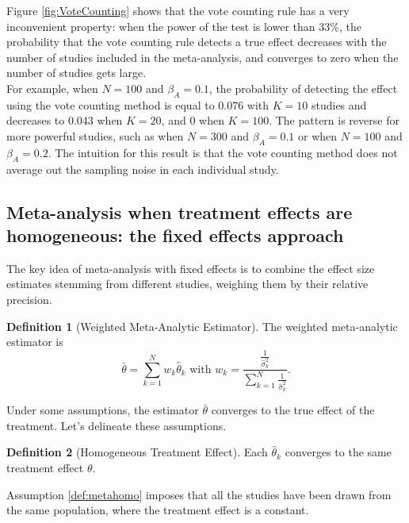 \documentclass[
]{book}
\theoremstyle{definition}
\newtheorem{definition}{Definition}[chapter]
\theoremstyle{definition}
\theoremstyle{definition}
\theoremstyle{definition}
\theoremstyle{remark}
\begin{document}
Figure \ref{fig:VoteCounting} shows that the vote counting rule has a very inconvenient property: when the power of the test is lower than 33\%, the probability that the vote counting rule detects a true effect decreases with the number of studies included in the meta-analysis, and converges to zero when the number of studies gets large.\\
For example, when \(N=100\) and \(\beta_A=0.1\), the probability of detecting the effect using the vote counting method is equal to 0.076 with \(K=10\) studies and decreases to 0.043 when \(K=20\), and 0 when \(K=100\).
The pattern is reverse for more powerful studies, such as when \(N=300\) and \(\beta_A=0.1\) or when \(N=100\) and \(\beta_A=0.2\).
The intuition for this result is that the vote counting method does not average out the sampling noise in each individual study.

\hypertarget{MetaWA}{%
\subsection{Meta-analysis when treatment effects are homogeneous: the fixed effects approach}\label{MetaWA}}

The key idea of meta-analysis with fixed effects is to combine the effect size estimates stemming from different studies, weighing them by their relative precision.

\begin{definition}[Weighted Meta-Analytic Estimator]
\protect\hypertarget{def:metaweights}{}{\label{def:metaweights} \iffalse (Weighted Meta-Analytic Estimator) \fi{} }The weighted meta-analytic estimator is
\[
\bar{\theta} = \sum_{k=1}^Nw_k\hat{\theta}_k \text{ with } w_k=\frac{\frac{1}{\hat{\sigma}^2_k}}{\sum_{k=1}^N\frac{1}{\hat{\sigma}^2_k}}.
\]
\end{definition}

Under some assumptions, the estimator \(\bar{\theta}\) converges to the true effect of the treatment.
Let's delineate these assumptions.

\begin{definition}[Homogeneous Treatment Effect]
\protect\hypertarget{def:metahomo}{}{\label{def:metahomo} \iffalse (Homogeneous Treatment Effect) \fi{} }Each \(\hat{\theta}_k\) converges to the same treatment effect \(\theta\).
\end{definition}

Assumption \ref{def:metahomo} imposes that all the studies have been drawn from the same population, where the treatment effect is a constant.
\end{document}
